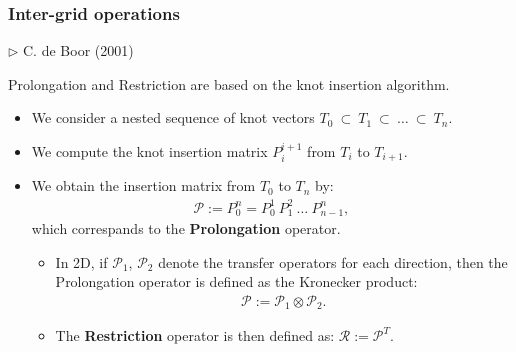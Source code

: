 \begin{frame}
\frametitle{Inter-grid operations}

\begin{flushright}
$\triangleright$  {\scriptsize C. de Boor (2001)}
\end{flushright}
  \small
Prolongation and Restriction are based on the knot insertion algorithm.
  \begin{itemize}

\item We consider a nested sequence of knot vectors $T_0 ~ \subset ~ T_1 ~ \subset ~\dots ~ \subset ~T_n$. 
\item We compute the knot insertion matrix $P_i^{i+1}$ from $T_i$ to $T_{i+1}$.
\item We obtain the insertion matrix from $T_0$ to $T_{n}$ by:
\begin{align*}
\mathcal{P} := P_0^{n} = P_0^{1} ~P_1^{2} ~ \dots ~ P_{n-1}^{n},
\end{align*}
which correspands to the \textbf{Prolongation} operator. 

  \begin{itemize}
\item[\ding{224}] In 2D, if $\mathcal{P}_1$, $\mathcal{P}_2$ denote the transfer operators for each direction, then the Prolongation operator is defined as the Kronecker product: 
\begin{align*}
\mathcal{P} := \mathcal{P}_1 \otimes \mathcal{P}_2.
\end{align*}

\item[\ding{224}]  The \textbf{Restriction} operator is then defined as: $\mathcal{R} := \mathcal{P}^T$.
  \end{itemize}
  
\end{itemize}
\end{frame}



